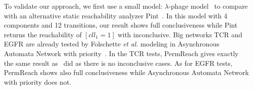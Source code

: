 \documentclass{article}
\theoremstyle{definition}
\begin{document}
To validate our approach, we first use a small model: $\lambda$-phage model~\cite{thieffry1995dynamical} to compare with an alternative static reachability analyzer Pint~\cite{pauleve2012}. In this model with 4 components and 12 transitions, our result shows full conclusiveness while Pint returns the reachability of $[cll_1=1]$ with inconclusive.
Big networks TCR and EGFR are already tested by Folschette \textit{et al.} modeling in Asynchronous Automata Network with priority~\cite{folschette2015}. 
In the TCR tests, PermReach gives exactly the same result as~\cite{folschette2015} did as there is no inconclusive cases. As for EGFR tests, PermReach shows also full conclusiveness while Asynchronous Automata Network with priority does not.
\end{document}
